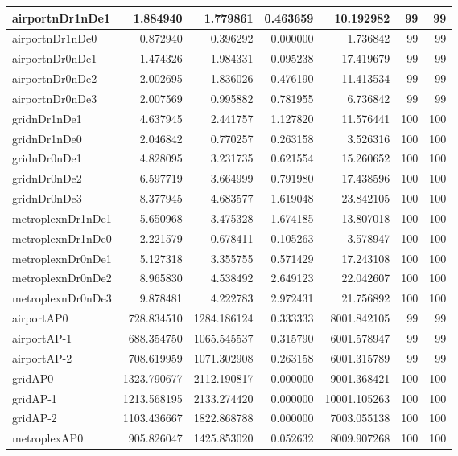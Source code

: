 \documentclass[../../../thesis.tex]{subfiles}
\begin{document}
\begin{longtable}{|l|r|r|r|r|r|r|}
\endlastfoot
airportnDr1nDe1 & 1.884940 & 1.779861 & 0.463659 & 10.192982 & 99 & 99 \\ \hline
airportnDr1nDe0 & 0.872940 & 0.396292 & 0.000000 & 1.736842 & 99 & 99 \\ \hline
airportnDr0nDe1 & 1.474326 & 1.984331 & 0.095238 & 17.419679 & 99 & 99 \\ \hline
airportnDr0nDe2 & 2.002695 & 1.836026 & 0.476190 & 11.413534 & 99 & 99 \\ \hline
airportnDr0nDe3 & 2.007569 & 0.995882 & 0.781955 & 6.736842 & 99 & 99 \\ \hline
gridnDr1nDe1 & 4.637945 & 2.441757 & 1.127820 & 11.576441 & 100 & 100 \\ \hline
gridnDr1nDe0 & 2.046842 & 0.770257 & 0.263158 & 3.526316 & 100 & 100 \\ \hline
gridnDr0nDe1 & 4.828095 & 3.231735 & 0.621554 & 15.260652 & 100 & 100 \\ \hline
gridnDr0nDe2 & 6.597719 & 3.664999 & 0.791980 & 17.438596 & 100 & 100 \\ \hline
gridnDr0nDe3 & 8.377945 & 4.683577 & 1.619048 & 23.842105 & 100 & 100 \\ \hline
metroplexnDr1nDe1 & 5.650968 & 3.475328 & 1.674185 & 13.807018 & 100 & 100 \\ \hline
metroplexnDr1nDe0 & 2.221579 & 0.678411 & 0.105263 & 3.578947 & 100 & 100 \\ \hline
metroplexnDr0nDe1 & 5.127318 & 3.355755 & 0.571429 & 17.243108 & 100 & 100 \\ \hline
metroplexnDr0nDe2 & 8.965830 & 4.538492 & 2.649123 & 22.042607 & 100 & 100 \\ \hline
metroplexnDr0nDe3 & 9.878481 & 4.222783 & 2.972431 & 21.756892 & 100 & 100 \\ \hline
airportAP0 & 728.834510 & 1284.186124 & 0.333333 & 8001.842105 & 99 & 99 \\ \hline
airportAP-1 & 688.354750 & 1065.545537 & 0.315790 & 6001.578947 & 99 & 99 \\ \hline
airportAP-2 & 708.619959 & 1071.302908 & 0.263158 & 6001.315789 & 99 & 99 \\ \hline
gridAP0 & 1323.790677 & 2112.190817 & 0.000000 & 9001.368421 & 100 & 100 \\ \hline
gridAP-1 & 1213.568195 & 2133.274420 & 0.000000 & 10001.105263 & 100 & 100 \\ \hline
gridAP-2 & 1103.436667 & 1822.868788 & 0.000000 & 7003.055138 & 100 & 100 \\ \hline
metroplexAP0 & 905.826047 & 1425.853020 & 0.052632 & 8009.907268 & 100 & 100 \\ \hline

\end{longtable}
\end{document}
